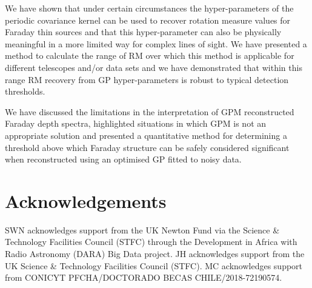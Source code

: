 \documentclass[fleqn,usenatbib]{mnras}
\begin{document}
We have shown that under certain circumstances the hyper-parameters of the periodic covariance kernel can be used to recover rotation measure values for Faraday thin sources and that this hyper-parameter can also be physically meaningful in a more limited way for complex lines of sight. We have presented a method to calculate the range of RM over which this method is applicable for different telescopes and/or data sets and we have demonstrated that within this range RM recovery from GP hyper-parameters is robust to typical detection thresholds.


We have discussed the limitations in the interpretation of GPM reconstructed Faraday depth spectra, highlighted situations in which GPM is not an appropriate solution and presented a quantitative method for determining a threshold above which Faraday structure can be safely considered significant when reconstructed using an optimised GP fitted to noisy data.



\section*{Acknowledgements}

SWN acknowledges support from the UK Newton Fund via the Science \& Technology Facilities Council (STFC) through the Development in Africa with Radio Astronomy (DARA) Big Data project. JH acknowledges support from the UK Science \& Technology Facilities Council (STFC). MC acknowledges support from CONICYT PFCHA/DOCTORADO BECAS CHILE/2018-72190574.







\end{document}
